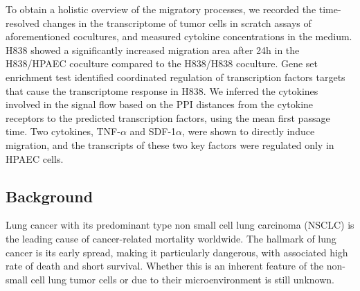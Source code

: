 To obtain a holistic overview of the migratory processes, 
we recorded the time-resolved changes in the transcriptome of tumor cells
in scratch assays of aforementioned cocultures, and measured
cytokine concentrations in the medium.
H838 showed a significantly increased migration area after 24h in the 
H838/HPAEC coculture compared to the H838/H838 coculture.
Gene set enrichment test identified coordinated regulation
of transcription factors targets
that cause the transcriptome response in H838. 
We inferred the cytokines involved in the signal flow based on the 
PPI distances from the cytokine receptors to the predicted
transcription factors, using the mean first passage time.
Two cytokines, TNF-$\alpha$ and SDF-1$\alpha$, were shown to directly 
induce migration, 
and the transcripts of these two key factors were regulated only 
in HPAEC cells.

\subsection{Background}
Lung cancer with its predominant type non small cell lung carcinoma 
(NSCLC) is the leading cause of cancer-related mortality worldwide.
The hallmark of lung cancer is its early spread, 
making it particularly dangerous, with associated high rate of death 
and short survival.
Whether this is an inherent feature of the non-small cell 
lung tumor cells or 
due to their microenvironment is still unknown. 

